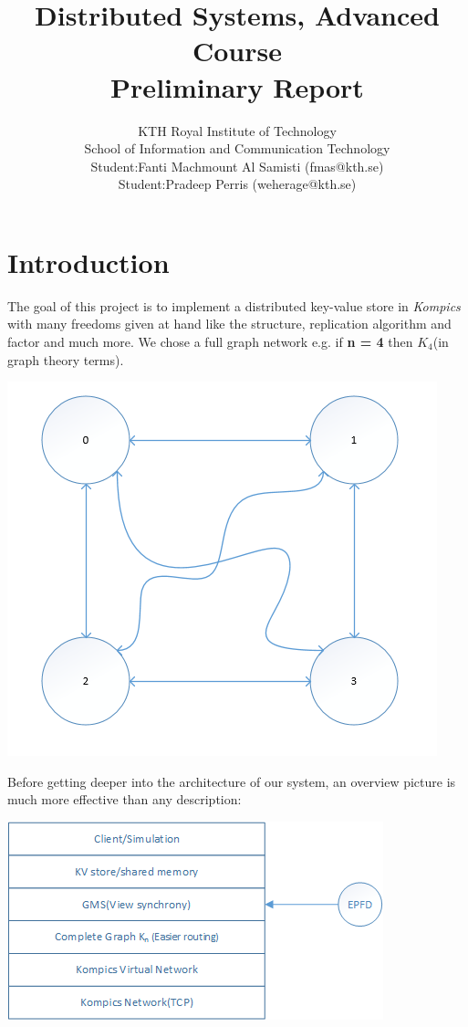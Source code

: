 \documentclass[a4paper, 11pt]{article}
\title{\textbf{Distributed Systems, Advanced Course \\ Preliminary Report}}
\author{KTH Royal Institute of Technology \\ 
		School of Information and Communication Technology \\
		Student:Fanti Machmount Al Samisti (fmas@kth.se) \\
		Student:Pradeep Perris (weherage@kth.se)}
\begin{document}
	
\maketitle

\tableofcontents

\clearpage

\section{Introduction}

\noindent The goal of this project is to implement a distributed key-value store in \textit{Kompics}\cite{kompics} with many freedoms given at hand like the structure, replication algorithm and factor and much more. We chose a full graph network e.g. if \textbf{n = 4} then $K_4$(in graph theory terms).

{\centering\includegraphics[scale = 0.9]{./figures/network-overview.png}\par}

\noindent Before getting deeper into the architecture of our system, an overview picture is much more effective than any description:

{\centering\includegraphics[scale = 0.9]{./figures/architecture.png}\par}
\end{document}
